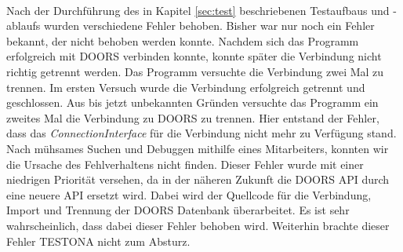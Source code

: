\paragraph{}
Nach der Durchführung des in Kapitel \ref{sec:test} beschriebenen Testaufbaus und - ablaufs wurden verschiedene Fehler behoben. Bisher war nur noch ein Fehler bekannt, der nicht behoben werden konnte. Nachdem sich das Programm erfolgreich mit DOORS verbinden konnte, konnte später die Verbindung nicht richtig getrennt werden. Das Programm versuchte die Verbindung zwei Mal zu trennen. Im ersten Versuch wurde die Verbindung erfolgreich getrennt und geschlossen. Aus bis jetzt unbekannten Gründen versuchte das Programm ein zweites Mal die Verbindung zu DOORS zu trennen. Hier entstand der Fehler, dass das \textit{ConnectionInterface} für die Verbindung nicht mehr zu Verfügung stand.\\


Nach mühsames Suchen und Debuggen mithilfe eines Mitarbeiters, konnten wir die Ursache des Fehlverhaltens nicht finden. Dieser Fehler wurde mit einer niedrigen Priorität versehen, da in der näheren Zukunft die DOORS API durch eine neuere API ersetzt wird. Dabei wird der Quellcode für die Verbindung, Import und Trennung der DOORS Datenbank überarbeitet. Es ist sehr wahrscheinlich, dass dabei dieser Fehler behoben wird. Weiterhin brachte dieser Fehler TESTONA nicht zum Absturz. 